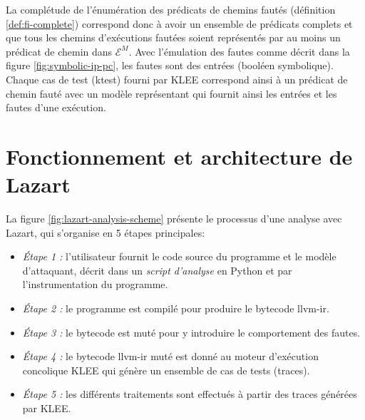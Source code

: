             La complétude de l'énumération des prédicats de chemins fautés (définition \ref{def:fi-complete}) correspond donc à avoir un ensemble de prédicats complets et que tous les chemins d'exécutions fautées soient représentés par au moins un prédicat de chemin dans $\mathcal{E}^M$.
            Avec l'émulation des fautes comme décrit dans la figure \ref{fig:symbolic-ip-pc}, les fautes sont des entrées (booléen symbolique).
            Chaque cas de test (ktest) fourni par KLEE correspond ainsi à un prédicat de chemin fauté avec un modèle représentant qui fournit ainsi les entrées et les fautes d'une exécution.
                
    \section{Fonctionnement et architecture de Lazart}
    \label{sec:lazart-architecture}
    
        La figure \ref{fig:lazart-analysis-scheme} présente le processus d'une analyse avec Lazart, qui s'organise en 5 étapes principales:
        \begin{itemize}
            \item \textit{Étape 1 :} l'utilisateur fournit le code source du programme et le modèle d'attaquant, décrit dans un \textit{script d'analyse} en Python et par l'instrumentation du programme.
            \item \textit{Étape 2 :} le programme est compilé pour produire le bytecode \gls{llvm-ir}.
            \item \textit{Étape 3 :} le bytecode est muté pour y introduire le comportement des fautes.
            \item \textit{Étape 4 :} le bytecode \gls{llvm-ir} muté est donné au moteur d'exécution concolique KLEE qui génère un ensemble de cas de tests (traces).
            \item \textit{Étape 5 :} les différents traitements sont effectués à partir des traces générées par KLEE.
        \end{itemize}
        
